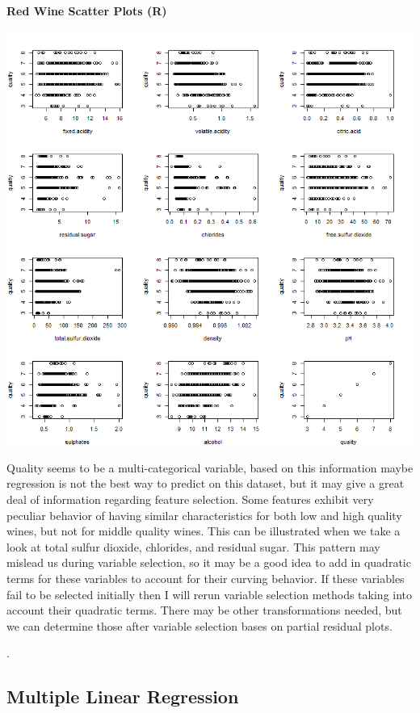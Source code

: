\documentclass{article}
\begin{document}
	
	\newpage 
	
	\textbf{Red Wine Scatter Plots (R)}
	
	\includegraphics[scale=0.7]{../plots/Wine/red_wine_Rscatter.png}
	\newline
	
	Quality seems to be a multi-categorical variable, based on this information maybe regression is not the best
	way to predict on this dataset, but it may give a great deal of information regarding feature selection. Some
	features exhibit very peculiar behavior of having similar characteristics for both low and high quality wines, but
	not for middle quality wines. This can be illustrated when we take a look at total sulfur dioxide, chlorides, and 
	residual sugar. This pattern may mislead us during variable selection, so it may be a good idea to add in 
	quadratic terms for these variables to account for their curving behavior. If these variables fail to be selected 
	initially then I will rerun variable selection methods taking into account their quadratic terms. There may 
	be other transformations needed, but we can determine those after variable selection bases on partial residual 
	plots. 
	
	\newpage
	. 

	\subsection{Multiple Linear Regression}
	
\end{document}
